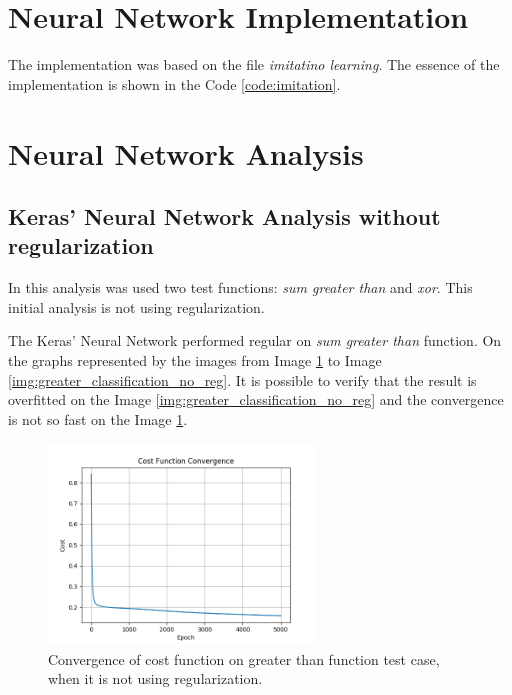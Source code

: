 \documentclass[journal]{IEEEtran}
\begin{document}
\section{Neural Network Implementation}

The implementation was based on the file \textit{imitatino learning}. The essence of the implementation is shown in the Code \ref{code:imitation}.



\section{Neural Network Analysis}

\subsection{Keras' Neural Network Analysis without regularization}

In this analysis was used two test functions: \textit{sum greater than} and \textit{xor}. This initial analysis is not using regularization.

The Keras' Neural Network performed regular on \textit{sum greater than} function. On the graphs represented by the images from Image \ref{img:greater_cost_no_reg} to Image \ref{img:greater_classification_no_reg}. It is possible to verify that the result is overfitted on the Image \ref{img:greater_classification_no_reg} and the convergence is not so fast on the Image \ref{img:greater_cost_no_reg}.

\begin{figure}
  \begin{center}
  \includegraphics[width=2.8in]{./../code/sgz_result/convergence_sgz_l0_0.png}
  \caption{Convergence of cost function on greater than function test case, when it is not using regularization.}
  \label{img:greater_cost_no_reg}
  \end{center}
\end{figure}
\end{document}
